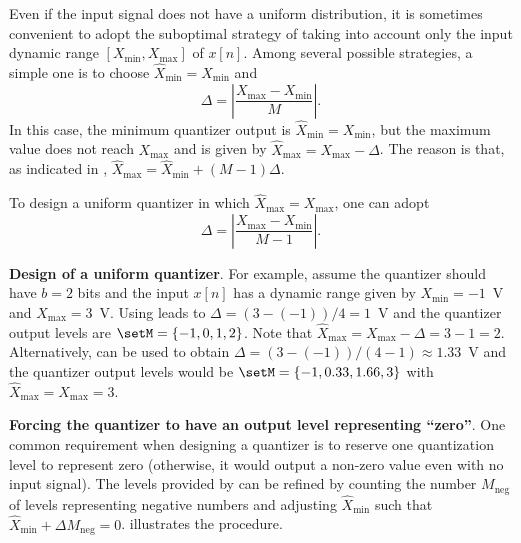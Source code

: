 Even if the input signal does not have a uniform distribution, it is sometimes convenient to adopt the suboptimal strategy of taking into account only the input dynamic range $[X_{\textrm{min}}, X_{\textrm{max}}]$ of $x[n]$. Among several possible strategies, a simple one is to choose $\hat X_{\textrm{min}} = X_{\textrm{min}}$ and
\begin{equation}
\Delta = \left| \frac{X_{\textrm{max}} - X_{\textrm{min}}}{M} \right|.
\label{eq:delta_simple_quantizer}
\end{equation}
In this case, the minimum quantizer output is $\hat X_{\textrm{min}} = X_{\textrm{min}}$, but the maximum value does not reach $X_{\textrm{max}}$ and is given by $\hat X_{\textrm{max}} = X_{\textrm{max}} - \Delta$. The reason is that, as indicated in , $\hat X_{\textrm{max}} = \hat X_{\textrm{min}}+(M-1)\Delta$. 

To design a uniform quantizer in which $\hat X_{\textrm{max}} = X_{\textrm{max}}$, one can adopt
\begin{equation}
\Delta = \left| \frac{X_{\textrm{max}} - X_{\textrm{min}}}{M-1} \right|.
\label{eq:delta_typical_quantizer}
\end{equation}

\bExample \textbf{Design of a uniform quantizer}.
\label{ex:uniform_quantizer_design}
For example, assume the quantizer should have $b=2$ bits and the input $x[n]$ has a dynamic range given by $X_{\textrm{min}}=-1$~V and $X_{\textrm{max}}=3$~V. Using  
leads to $\Delta = (3 - (-1)) / 4 = 1$~V and the quantizer output levels are $\setM = \{-1, 0, 1, 2\}$. Note that $\hat X_{\textrm{max}} = X_{\textrm{max}} - \Delta = 3 - 1  =2$.
Alternatively, 
 can be used to obtain $\Delta = (3 - (-1)) / (4 - 1) \approx 1.33$~V and the quantizer output levels would be $\setM = \{-1, 0.33, 1.66, 3\}$ with $\hat X_{\textrm{max}} = X_{\textrm{max}} = 3$.
\eExample

\bExample \textbf{Forcing the quantizer to have an output level representing ``zero''}.
One common requirement when designing a quantizer is to reserve one quantization level to represent zero (otherwise, it would output a non-zero value even with no input signal). The levels provided by  can be refined by counting the number $M_{\textrm{neg}}$ of levels representing negative numbers and adjusting $\hat X_{\textrm{min}}$ such that $\hat X_{\textrm{min}} + \Delta M_{\textrm{neg}} = 0$.   illustrates the procedure.


